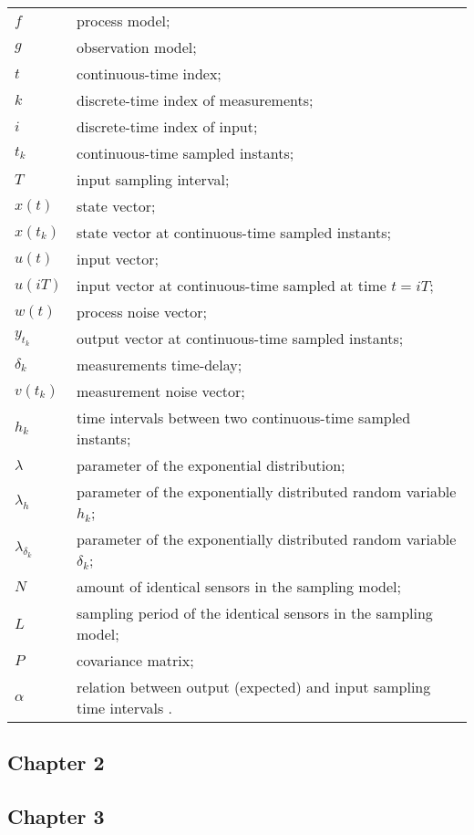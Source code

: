 \begin{longtable}{ll}
$f$						& process model; \\
$g$						& observation model; \\
$t$						& continuous-time index; \\
$k$						& discrete-time index of measurements; \\
$i$						& discrete-time index of input; \\
$t_k$					& continuous-time sampled instants; \\
$T$						& input sampling interval; \\
$x(t)$					& state vector; \\
$x(t_k)$				& state vector at continuous-time sampled instants; \\
$u(t)$					& input vector; \\
$u(iT)$					& input vector at continuous-time sampled at time $t = iT$; \\						
$w(t)$					& process noise vector; \\
$y_{t_k}$            	& output vector at continuous-time sampled instants;\\
$\delta_{k}$			& measurements time-delay; \\
$v(t_k)$				& measurement noise vector; \\
$h_k$					& time intervals between two continuous-time sampled instants; \\
$\lambda$ 				& parameter of the exponential distribution; \\
$\lambda_h$				& parameter of the exponentially distributed random variable $h_k$; \\
$\lambda_{\delta_{k}}$	& parameter of the exponentially distributed random variable $\delta_{k}$; \\
$N$						& amount of identical sensors in the sampling model; \\
$L$						& sampling period of the identical sensors in the sampling model; \\
$P$						& covariance matrix; \\
$\alpha$				& relation between output (expected) and input sampling time intervals . \\
\end{longtable}

\subsection*{Chapter 2}


\subsection*{Chapter 3}

